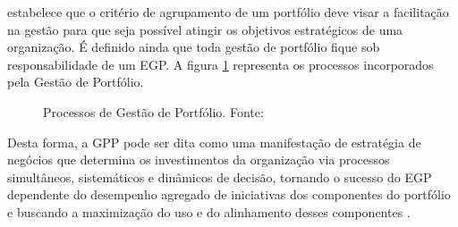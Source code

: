  estabelece que o critério de agrupamento de um portfólio deve visar a facilitação na gestão para que seja possível atingir os objetivos estratégicos de uma organização. É definido ainda que toda gestão de portfólio fique sob responsabilidade de um EGP. A figura \ref{estrategia_portfolio} representa os processos incorporados pela Gestão de Portfólio.

\begin{figure}[ht]
  \centering
  \caption{Processos de Gestão de Portfólio. Fonte: \cite{pmi2006}}
  \label{estrategia_portfolio}
\end{figure}

Desta forma, a GPP pode ser dita como uma manifestação de estratégia de negócios que determina os investimentos da organização via processos simultâneos, sistemáticos e dinâmicos de decisão, tornando o sucesso do EGP dependente do desempenho agregado de iniciativas dos componentes do portfólio e buscando a maximização do uso e do alinhamento desses componentes \cite{pmiguide2014}.

